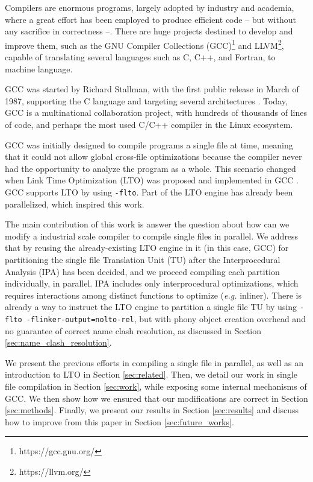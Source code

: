 \documentclass[runningheads]{llncs}
\begin{document}
Compilers are enormous programs, largely adopted by industry and academia, where
a great effort has been employed to produce efficient code --
but without any sacrifice in correctness --. There are huge projects destined
to develop and improve them, such as the GNU Compiler Collections
(GCC)\footnote{https://gcc.gnu.org/} and LLVM\footnote{https://llvm.org/}, capable
of translating several languages such as C, C++, and Fortran, to machine language.

GCC was started by Richard Stallman, with the first public release in March of
1987, supporting the C language and targeting several architectures
\cite{gcc-first-ver}. Today, GCC is a multinational collaboration
project, with hundreds of thousands of lines of code, and perhaps the most used C/C++
compiler in the Linux ecosystem.

GCC was initially designed to compile programs a single file at time, meaning
that it could not allow global cross-file optimizations because the compiler
never had the opportunity to analyze the program as a whole. This scenario
changed when Link Time Optimization (LTO) was proposed \cite{gcc-lto,whoprgoogle} and
implemented in GCC \cite{glek2010optimizing}. GCC supports LTO by using
\texttt{-flto}. Part of the LTO engine has already been parallelized, which
inspired this work.

The main contribution of this work is answer the question about how can we modify a
industrial scale compiler to compile single files in parallel. We address
that by reusing the already-existing LTO engine in it (in this
case, GCC) for partitioning the single file Translation Unit (TU) after the
Interprocedural Analysis (IPA) has been decided, and we proceed compiling
each partition individually, in parallel. IPA includes only interprocedural
optimizations, which requires interactions among distinct functions to optimize
(\emph{e.g.} inliner). There is already a way to instruct
the LTO engine to partition a single file TU by using
\texttt{-flto -flinker-output=nolto-rel}, but with phony object creation
overhead and no guarantee of correct name clash resolution, as discussed
in Section \ref{sec:name_clash_resolution}.

We present the previous efforts in compiling a single file in
parallel, as well as an introduction to LTO in Section \ref{sec:related}.
Then, we detail our work in single file compilation in
Section \ref{sec:work}, while exposing some internal mechanisms
of GCC. We then show how we ensured that our modifications are correct
in Section \ref{sec:methods}. Finally, we present our results in
Section \ref{sec:results} and discuss how to improve from this paper
in Section \ref{sec:future_works}.
\end{document}
